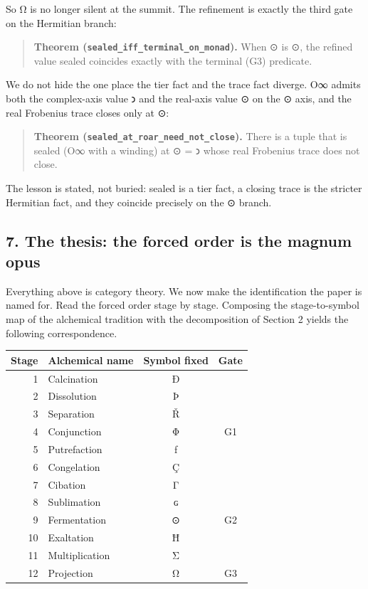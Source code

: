 \documentclass[12pt,a4paper]{article}
\begin{document}
So Ω is no longer silent at the summit. The refinement is exactly the
third gate on the Hermitian branch:

\begin{quote}
\textbf{Theorem (\texttt{sealed\_iff\_terminal\_on\_monad}).} When ⊙ is
⊙, the refined value sealed coincides exactly with the terminal (G3)
predicate.
\end{quote}

We do not hide the one place the tier fact and the trace fact diverge.
O∞ admits both the complex-axis value 𐑮 and the real-axis value ⊙ on the
⊙ axis, and the real Frobenius trace closes only at ⊙:

\begin{quote}
\textbf{Theorem (\texttt{sealed\_at\_roar\_need\_not\_close}).} There is
a tuple that is sealed (O∞ with a winding) at ⊙ = 𐑮 whose real Frobenius
trace does not close.
\end{quote}

The lesson is stated, not buried: sealed is a tier fact, a closing trace
is the stricter Hermitian fact, and they coincide precisely on the ⊙
branch.

\hypertarget{the-thesis-the-forced-order-is-the-magnum-opus}{%
\subsection{7. The thesis: the forced order is the magnum
opus}\label{the-thesis-the-forced-order-is-the-magnum-opus}}

Everything above is category theory. We now make the identification the
paper is named for. Read the forced order stage by stage. Composing the
stage-to-symbol map of the alchemical tradition with the decomposition
of Section 2 yields the following correspondence.

\begin{longtable}[]{@{}rlcc@{}}
\toprule
Stage & Alchemical name & Symbol fixed & Gate\tabularnewline
\midrule
\endhead
1 & Calcination & Ð &\tabularnewline
2 & Dissolution & Þ &\tabularnewline
3 & Separation & Ř &\tabularnewline
4 & Conjunction & Φ & G1\tabularnewline
5 & Putrefaction & ƒ &\tabularnewline
6 & Congelation & Ç &\tabularnewline
7 & Cibation & Γ &\tabularnewline
8 & Sublimation & ɢ &\tabularnewline
9 & Fermentation & ⊙ & G2\tabularnewline
10 & Exaltation & Ħ &\tabularnewline
11 & Multiplication & Σ &\tabularnewline
12 & Projection & Ω & G3\tabularnewline
\bottomrule
\end{longtable}
\end{document}

